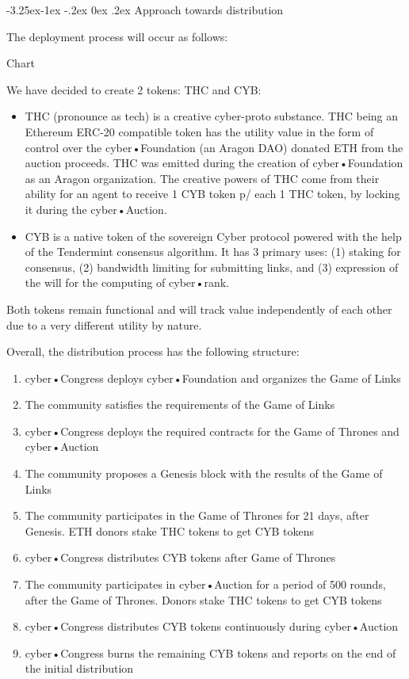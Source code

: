 \documentclass[8pt,oneside]{amsart}
\makeatletter
\renewcommand\subsection{\@startsection{subsection}{2}{\z@}%
                                     {-3.25ex\@plus -1ex \@minus -.2ex}%
                                     {0ex \@plus .2ex}%
                                     {\play\Large}}%
\newcommand{\titleSection}[1]{\subsection{#1}}
\makeatother
\begin{document}
\begin{Abstract}
\titleSection{Approach towards distribution}\label{Approach towards distribution}

The deployment process will occur as follows:

Chart

We have decided to create 2 tokens: THC and CYB:

\begin{itemize}
\item THC (pronounce as tech) is a creative cyber-proto substance. THC being an Ethereum ERC-20 compatible token has the utility value in the form of control over the cyber•Foundation (an Aragon DAO) donated ETH from the auction proceeds. THC was emitted during the creation of cyber•Foundation as an Aragon organization. The creative powers of THC come from their ability for an agent to receive 1 CYB token p/ each 1 THC token, by locking it during the cyber•Auction.
\item CYB is a native token of the sovereign Cyber protocol powered with the help of the Tendermint consensus algorithm. It has 3 primary uses: (1) staking for consensus, (2) bandwidth limiting for submitting links, and (3) expression of the will for the computing of cyber•rank.
\end{itemize}

Both tokens remain functional and will track value independently of each other due to a very different utility by nature.

Overall, the distribution process has the following structure:

\begin{enumerate}
 \item cyber•Congress deploys cyber•Foundation and organizes the Game of Links
 \item The community satisfies the requirements of the Game of Links
 \item cyber•Congress deploys the required contracts for the Game of Thrones and cyber•Auction
 \item The community proposes a Genesis block with the results of the Game of Links
 \item The community participates in the Game of Thrones for 21 days, after Genesis. ETH donors stake THC tokens to get CYB tokens
 \item cyber•Congress distributes CYB tokens after Game of Thrones
 \item The community participates in cyber•Auction for a period of 500 rounds, after the Game of Thrones. Donors stake THC tokens to get CYB tokens
 \item cyber•Congress distributes CYB tokens continuously during cyber•Auction
 \item cyber•Congress burns the remaining CYB tokens and reports on the end of the initial distribution
\end{enumerate}


\end{Abstract}
\end{document}
